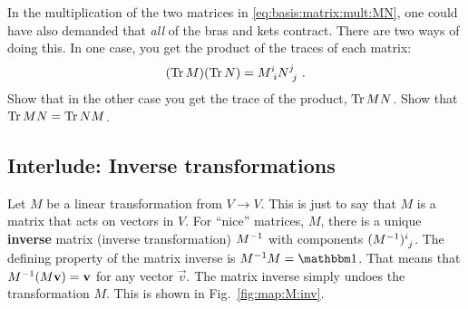 \begin{exercise}\label{eq:matrix:product:trace}
In the multiplication of the two matrices in \eqref{eq:basis:matrix:mult:MN}, one could have also demanded that \emph{all} of the bras and kets contract. There are two ways of doing this. In one case, you get the product of the traces of each matrix:
\begin{align}
    (\Tr{M})(\Tr{N}) = M\aij{i}{i} N\aij{j}{j} \ .
\end{align}
Show that in the other case you get the trace of the product, $\operatorname{\textnormal{Tr}}{MN}$. Show that $\operatorname{\textnormal{Tr}}{MN} = \operatorname{\textnormal{Tr}}{NM}$.
\end{exercise}



\subsection{Interlude: Inverse transformations}

Let $M$ be a linear transformation from $V\to V$. This is just to say that $M$ is a matrix that acts on vectors in $V$. For ``nice'' matrices, $M$, there is a unique \textbf{inverse} matrix (inverse transformation) $M^{-1}$ with components $(M\inv)\aij{i}{j}$. The defining property of the matrix inverse is $M\inv M = \one $. That means that $M^{-1}(M\mathbf{v})=\mathbf{v}$ for any vector $\vec{v}$. The matrix inverse simply undoes the transformation $M$. This is shown in Fig.~\ref{fig:map:M:inv}. 




